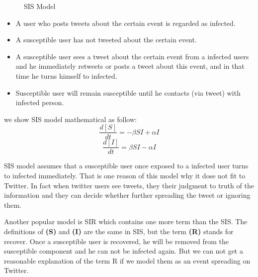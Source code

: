\begin{figure}[!h]
\center
\def\layersep{2.5cm}
   \caption{SIS Model}
\label{fig:SIS}
\end{figure}
	
\begin{itemize}
\item A user who posts tweets about the certain event is regarded as infected.
\item A susceptible user has not tweeted about the certain event.
\item A susceptible user sees a tweet about the certain event from a infected users and he immediately retweets or posts a tweet about this event, and in that time he turns himself to infected.
\item Susceptible user will remain susceptible until he contacts (via tweet) with infected person.
\end{itemize}
we show SIS model mathematical as follow:
\begin{equation}
\frac{d[S]}{dt}=- \beta SI+\alpha I
\end{equation}
\begin{equation}
\frac{d[I]}{dt}= \beta SI-\alpha I
\end{equation}

SIS model assumes that a susceptible user once exposed to a infected user turns to infected immediately. That is one reason of this model why it dose not fit to Twitter. In fact when twitter users see tweets, they  their judgment to  truth of the information and they can decide whether further spreading the tweet or ignoring them.

Another popular model is SIR which contains one more term than the SIS. The definitions of \textbf{(S)} and \textbf{(I)} are the same in SIS, but the term \textbf{(R)} stands for recover. Once a susceptible user is recovered, he will be removed from the susceptible component and he can not be infected again. But we can not get a reasonable explanation of the term R if we model them as an event spreading on Twitter.

